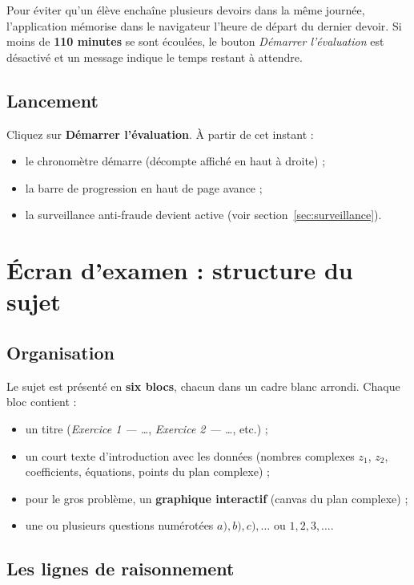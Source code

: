 \documentclass[11pt,a4paper]{article}
\begin{document}
Pour éviter qu'un élève enchaîne plusieurs devoirs dans la même journée,
l'application mémorise dans le navigateur l'heure de départ du dernier devoir.
Si moins de \textbf{110 minutes} se sont écoulées, le bouton
\emph{Démarrer l'évaluation} est désactivé et un message indique le temps
restant à attendre.

\subsection{Lancement}

Cliquez sur \textbf{Démarrer l'évaluation}. À partir de cet instant :
\begin{itemize}
  \item le chronomètre démarre (décompte affiché en haut à droite) ;
  \item la barre de progression en haut de page avance ;
  \item la surveillance anti-fraude devient active
        (voir section~\ref{sec:surveillance}).
\end{itemize}

\section{Écran d'examen : structure du sujet}

\subsection{Organisation}

Le sujet est présenté en \textbf{six blocs}, chacun dans un cadre blanc
arrondi. Chaque bloc contient :
\begin{itemize}
  \item un titre (\emph{Exercice 1 — \dots}, \emph{Exercice 2 — \dots},
        etc.) ;
  \item un court texte d'introduction avec les données (nombres complexes
        \(z_1\), \(z_2\), coefficients, équations, points du plan complexe) ;
  \item pour le gros problème, un \textbf{graphique interactif} (canvas du
        plan complexe) ;
  \item une ou plusieurs questions numérotées \(a), b), c), \dots\) ou
        \(1, 2, 3, \dots\).
\end{itemize}

\subsection{Les lignes de raisonnement}
\end{document}
